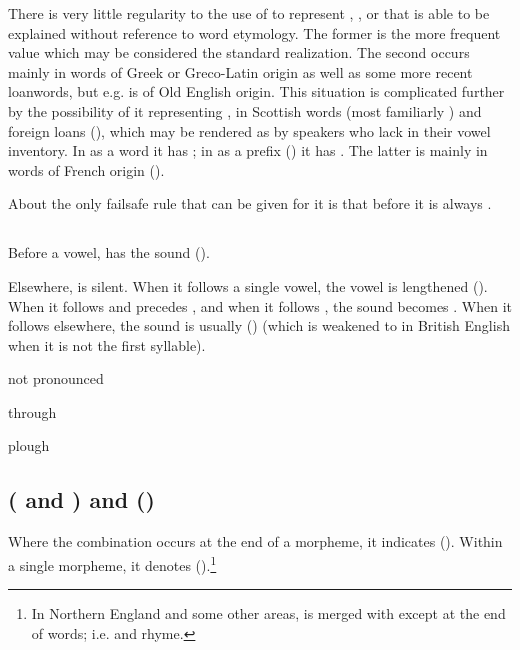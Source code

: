 There is very little regularity to the use of  to represent ,
, or  that is able to be explained without reference to word
etymology. The former is the more frequent value which may be considered the
standard realization. The second occurs mainly in words of Greek or Greco-Latin
origin as well as some more recent loanwords, but e.g.  is of Old
English origin. This situation is complicated further by the possibility of it
representing , in Scottish words (most familiarly ) and foreign
loans (), which may be rendered as  by speakers who lack
 in their vowel inventory. In  as a word it has ; in
 as a prefix () it has . The latter is
mainly in words of French origin ().

About the only failsafe rule that can be given for it is that before  it
is always .

\subsection{}

Before a vowel,  has the sound  ().

Elsewhere,  is silent. When it follows a single vowel, the vowel is
lengthened (). When it follows  and precedes , and
when it follows , the sound becomes . When it follows 
elsewhere, the sound is usually  () (which is weakened
to  in British English when it is not the first syllable).

\begin{exceptions}{ not pronounced }
\item through
\item plough
\end{exceptions}

\subsection{ ( and ) and  ()}

Where the combination  occurs at the end of a morpheme, it indicates
 (). Within a single morpheme, it denotes 
().\footnote{In Northern England and some other areas,
 is merged with  except at the end of words; i.e.  and
 rhyme.}

